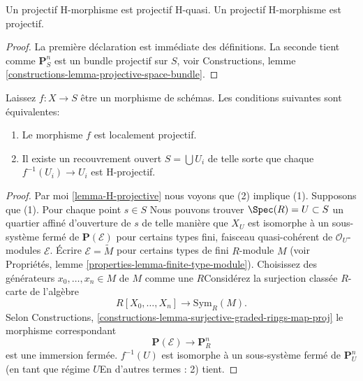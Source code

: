 \begin{lemma}

\label{lemma-H-projective}

Un projectif H-morphisme est projectif H-quasi. Un projectif H-morphisme est projectif.

\end{lemma}

\begin{proof}
La première déclaration est immédiate des définitions. La seconde tient comme $\mathbf{P}^n_S$ est un bundle projectif sur $S$, voir Constructions, lemme \ref{constructions-lemma-projective-space-bundle}.
\end{proof}

\begin{lemma}

\label{lemma-characterize-locally-projective}
Laissez $f : X \to S$ être un morphisme de schémas. Les conditions suivantes sont équivalentes:
\begin{enumerate}
\item Le morphisme $f$ est localement projectif.
\item Il existe un recouvrement ouvert $S = \bigcup U_i$ de telle sorte que chaque $f^{-1}(U_i) \to U_i$ est H-projectif.
\end{enumerate}

\end{lemma}

\begin{proof}

Par moi \ref{lemma-H-projective} nous voyons que (2) implique (1). Supposons que (1). Pour chaque point $s \in S$ Nous pouvons trouver $\Spec(R) = U \subset S$
un quartier affiné d'ouverture de $s$ de telle manière que $X_U$ est isomorphe à un sous-système fermé de $\mathbf{P}(\mathcal{E})$ pour certains types fini, faisceau quasi-cohérent de $\mathcal{O}_U$-modules $\mathcal{E}$. Écrire $\mathcal{E} = \widetilde{M}$ pour certains types de fini
$R$-module $M$ (voir Propriétés, lemme \ref{properties-lemma-finite-type-module}). Choisissez des générateurs $x_0, \ldots, x_n \in M$ de $M$ comme une $R$Considérez la surjection classée $R$- carte de l'algèbre
$$
R[X_0, \ldots, X_n] \longrightarrow \text{Sym}_R(M).
$$
Selon Constructions, \ref{constructions-lemma-surjective-graded-rings-map-proj}
le morphisme correspondant
$$
\mathbf{P}(\mathcal{E}) \to \mathbf{P}^n_R
$$
est une immersion fermée. $f^{-1}(U)$ est isomorphe à un sous-système fermé de $\mathbf{P}^n_U$ (en tant que régime $U$En d'autres termes : 2) tient.

\end{proof}

